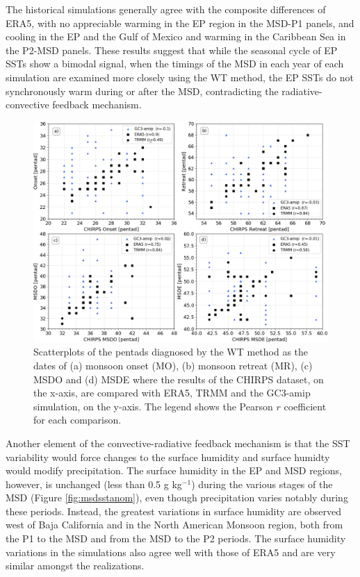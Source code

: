 The historical simulations generally agree with the composite differences of ERA5, with no appreciable warming in the EP region in the MSD-P1 panels, and cooling in the EP and the Gulf of Mexico and warming in the Caribbean Sea in the P2-MSD panels.
These results suggest that while the seasonal cycle of EP SSTs show a bimodal signal, when the timings of the MSD in each year of each simulation are examined more closely using the WT method, the EP SSTs do not synchronously warm during or after the MSD, contradicting the radiative-convective feedback mechanism.


\begin{figure}[t!]
\includegraphics[width=\linewidth]{figures/master_sst_scatter.png}
\caption[Scatter plot of SST vs precipitation]{Scatterplots of the pentads diagnosed by the WT method as the dates of (a) monsoon onset (MO), (b) monsoon retreat (MR), (c) MSDO and (d) MSDE where the results of the CHIRPS dataset, on the x-axis, are compared with ERA5, TRMM and the GC3-amip simulation, on the y-axis. The legend shows the Pearson $r$ coefficient for each comparison. }
\label{fig:amipsstscatter}
\end{figure}

Another element of the convective-radiative feedback mechanism is that the SST variability would force changes to the surface humidity and surface humidty would modify precipitation. The surface humidity in the EP and MSD regions, however, is unchanged (less than 0.5 g kg$^{-1}$) during the various stages of the MSD (Figure \ref{fig:msdsstanom}), even though precipitation varies notably during these periods. Instead, the greatest variations in surface humidity are observed west of Baja California and in the North American Monsoon region, both from the P1 to the MSD and from the MSD to the P2 periods. %
 The surface humidity variations in the simulations also agree well with those of ERA5 and are very similar amongst the realizations.


